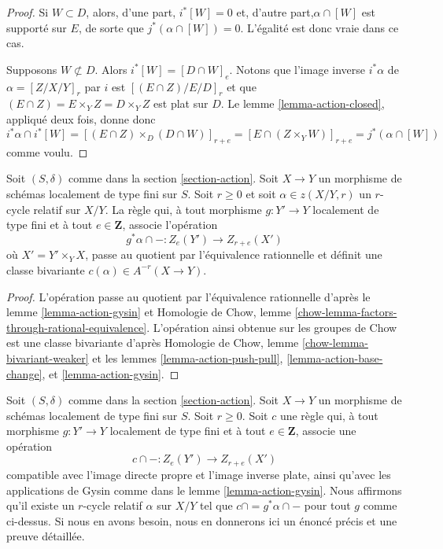 \begin{proof}
\medskip\noindent
 Si $W \subset D$, alors, d'une part, $i^*[W] = 0$ et, d'autre
 part,$\alpha \cap [W]$ est supporté sur $E$, de sorte que 
$j^*(\alpha \cap [W]) = 0$. L'égalité est donc vraie dans ce cas. 

\medskip\noindent
 Supposons $W \not \subset D$. Alors $i^*[W] = [D \cap W]_e$.
 Notons que l'image inverse $i^*\alpha$ de $\alpha = [Z/X/Y]_r$
 par $i$ est $[(E \cap Z)/E/D]_r$ et que 
$(E \cap Z) = E \times_Y Z = D \times_Y Z$
 est plat sur $D$. Le lemme \ref{lemma-action-closed}, appliqué
 deux fois, donne donc 
$$
i^*\alpha \cap i^*[W] =
[(E \cap Z) \times_D (D \cap W)]_{r + e} =
[E \cap (Z \times_Y W)]_{r + e} =
j^*(\alpha \cap [W])
$$
 comme voulu. 
\end{proof} 

\begin{proposition} 
\label{proposition-get-bivariant-class} 
Soit $(S, \delta)$ comme dans la section \ref{section-action}. Soit $X \to Y$
 un morphisme de schémas localement de type fini sur $S$. Soit $r \geq 0$
 et soit $\alpha \in z(X/Y, r)$ un $r$-cycle relatif sur $X/Y$.
 La règle qui, à tout morphisme $g : Y' \to Y$ localement de type fini
 et à tout $e \in \mathbf{Z}$, associe l'opération 
$$
g^*\alpha \cap - : Z_e(Y') \to Z_{r + e}(X')
$$
 où $X' = Y' \times_Y X$, passe au quotient par l'équivalence rationnelle 
et définit une classe bivariante $c(\alpha) \in A^{-r}(X \to Y)$. 
\end{proposition} 

\begin{proof} 
L'opération passe au quotient par l'équivalence rationnelle d'après 
le lemme \ref{lemma-action-gysin} et 
Homologie de Chow, lemme \ref{chow-lemma-factors-through-rational-equivalence}. L'opération
 ainsi obtenue sur les groupes de Chow est une classe bivariante d'après 
Homologie de Chow, lemme \ref{chow-lemma-bivariant-weaker} et 
les
 lemmes \ref{lemma-action-push-pull}, \ref{lemma-action-base-change}, et 
\ref{lemma-action-gysin}. 
\end{proof} 

\begin{remark} 
\label{remark-characterize-relative-cycles} 
Soit $(S, \delta)$ comme dans la section \ref{section-action}. Soit $X \to Y$
 un morphisme de schémas localement de type fini sur $S$. Soit $r \geq 0$.
 Soit $c$ une règle qui, à tout morphisme $g : Y' \to Y$ localement de type
 fini et à tout $e \in \mathbf{Z}$, associe une opération 
$$
c \cap - : Z_e(Y') \to Z_{r + e}(X')
$$
 compatible avec l'image directe propre et l'image inverse plate, ainsi qu'avec les applications de Gysin comme dans
 le lemme \ref{lemma-action-gysin}. Nous affirmons qu'il existe un $r$-cycle relatif 
$\alpha$ sur $X/Y$ tel que $c \cap = g^*\alpha \cap -$ pour tout $g$ comme ci-dessus.
 Si nous en avons besoin, nous en donnerons ici un énoncé précis et une preuve détaillée. 
\end{remark} 









